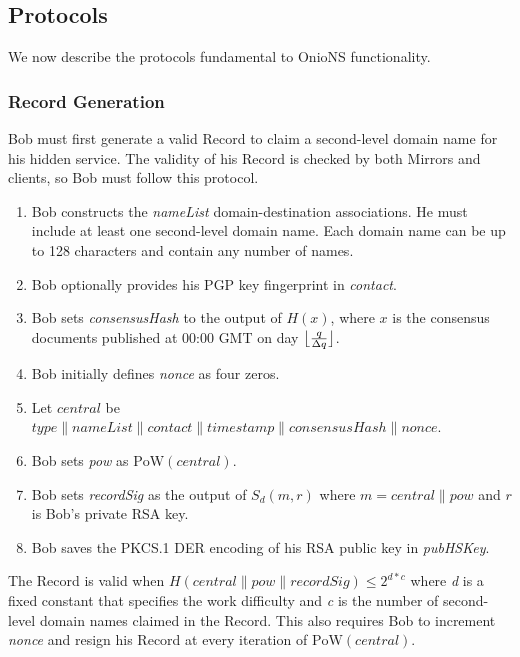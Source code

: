 \documentclass{sig-alternate}
\DeclarePairedDelimiter{\floor}{\lfloor}{\rfloor}
\newcommand*\concat{\mathbin{\|}}
\begin{document}
\newpage

\subsection{Protocols} %

We now describe the protocols fundamental to OnioNS functionality.

\subsubsection{Record Generation} %

Bob must first generate a valid Record to claim a second-level domain name for his hidden service. The validity of his Record is checked by both Mirrors and clients, so Bob must follow this protocol.

\begin{enumerate}[noitemsep]
	\item Bob constructs the \emph{nameList} domain-destination associations. He must include at least one second-level domain name. Each domain name can be up to 128 characters and contain any number of names.
	\item Bob optionally provides his PGP key fingerprint in \emph{contact}.
	\item Bob sets \emph{consensusHash} to the output of $ H(x) $, where $ x $ is the consensus documents published at 00:00 GMT on day $ \floor[\big]{\frac{q}{\Delta q}} $.
	\item Bob initially defines \emph{nonce} as four zeros.
	\item Let $ \mathit{central} $ be $\mathit{type} \concat \mathit{nameList} \concat \mathit{contact} \concat \mathit{timestamp} \concat \mathit{consensusHash} \concat \mathit{nonce} $.
	\item Bob sets \emph{pow} as $ \mathrm{PoW}(\mathit{central}) $.
	\item Bob sets \emph{recordSig} as the output of $ S_{d}(m, r) $ where $ m = \mathit{central} \concat \mathit{pow} $ and $ r $ is Bob's private RSA key.
	\item Bob saves the PKCS.1 DER encoding of his RSA public key in \emph{pubHSKey}.
\end{enumerate}

The Record is valid when $ H(\mathit{central} \concat \mathit{pow} \concat \mathit{recordSig}) \leq 2^{\mathit{d} * \mathit{c}} $ where \emph{d} is a fixed constant that specifies the work difficulty and \emph{c} is the number of second-level domain names claimed in the Record. This also requires Bob to increment \emph{nonce} and resign his Record at every iteration of $ \mathrm{PoW}(\mathit{central}) $.
\end{document}
